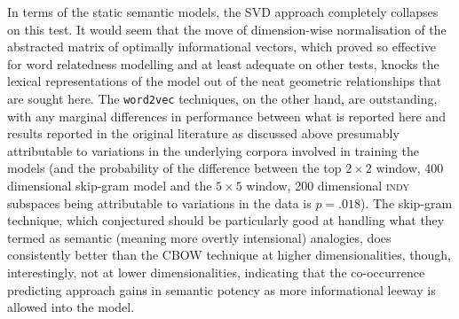 In terms of the static semantic models, the SVD approach completely collapses on this test.  It would seem that the move of dimension-wise normalisation of the abstracted matrix of optimally informational vectors, which proved so effective for word relatedness modelling and at least adequate on other tests, knocks the lexical representations of the model out of the neat geometric relationships that are sought here.  The \texttt{word2vec} techniques, on the other hand, are outstanding, with any marginal differences in performance between what is reported here and results reported in the original literature as discussed above presumably attributable to variations in the underlying corpora involved in training the models (and the probability of the difference between the top $2 \times 2$ window, 400 dimensional skip-gram model and the $5 \times 5$ window, 200 dimensional \textsc{indy} subspaces being attributable to variations in the data is $p = .018$).  The skip-gram technique, which \cite{MikolovEA2013} conjectured should be particularly good at handling what they termed as semantic (meaning more overtly intensional) analogies, does consistently better than the CBOW technique at higher dimensionalities, though, interestingly, not at lower dimensionalities, indicating that the co-occurrence predicting approach gains in semantic potency as more informational leeway is allowed into the model.

